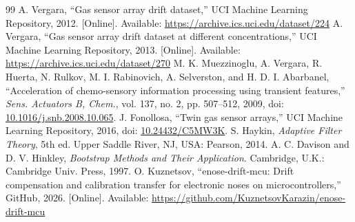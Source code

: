\begin{thebibliography}{99}
 A. Vergara, ``Gas sensor array drift dataset,'' UCI Machine Learning Repository, 2012. [Online]. Available: \url{https://archive.ics.uci.edu/dataset/224}
 A. Vergara, ``Gas sensor array drift dataset at different concentrations,'' UCI Machine Learning Repository, 2013. [Online]. Available: \url{https://archive.ics.uci.edu/dataset/270}
 M. K. Muezzinoglu, A. Vergara, R. Huerta, N. Rulkov, M. I. Rabinovich, A. Selverston, and H. D. I. Abarbanel, ``Acceleration of chemo-sensory information processing using transient features,'' \emph{Sens. Actuators B, Chem.}, vol. 137, no. 2, pp. 507--512, 2009, doi: \href{https://doi.org/10.1016/j.snb.2008.10.065}{10.1016/j.snb.2008.10.065}.
 J. Fonollosa, ``Twin gas sensor arrays,'' UCI Machine Learning Repository, 2016, doi: \href{https://doi.org/10.24432/C5MW3K}{10.24432/C5MW3K}.
 S. Haykin, \emph{Adaptive Filter Theory}, 5th ed. Upper Saddle River, NJ, USA: Pearson, 2014.
 A. C. Davison and D. V. Hinkley, \emph{Bootstrap Methods and Their Application}. Cambridge, U.K.: Cambridge Univ. Press, 1997.
 O. Kuznetsov, ``enose-drift-mcu: Drift compensation and calibration transfer for electronic noses on microcontrollers,'' GitHub, 2026. [Online]. Available: \url{https://github.com/KuznetsovKarazin/enose-drift-mcu}
\end{thebibliography}
